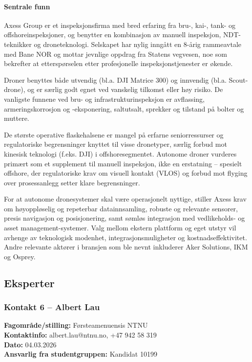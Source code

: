 \paragraph{Sentrale funn}

Axess Group er et inspeksjonsfirma med bred erfaring fra bru-, kai-, tank- og offshoreinspeksjoner, og benytter en kombinasjon av manuell inspeksjon, NDT-teknikker og droneteknologi. Selskapet har nylig inngått en 8-årig rammeavtale med Bane NOR og mottar jevnlige oppdrag fra Statens vegvesen, noe som bekrefter at etterspørselen etter profesjonelle inspeksjonstjenester er økende.

Droner benyttes både utvendig (bl.a. DJI Matrice 300) og innvendig (bl.a. Scout-drone), og er særlig godt egnet ved vanskelig tilkomst eller høy risiko. De vanligste funnene ved bru- og infrastrukturinspeksjon er avflassing, armeringskorrosjon og -eksponering, saltutsalt, sprekker og tilstand på bolter og muttere.

De største operative flaskehalsene er mangel på erfarne seniorressurser og regulatoriske begrensninger knyttet til visse dronetyper, særlig forbud mot kinesisk teknologi (f.eks. DJI) i offshoresegmentet. Autonome droner vurderes primært som et supplement til manuell inspeksjon, ikke en erstatning – spesielt offshore, der regulatoriske krav om visuell kontakt (VLOS) og forbud mot flyging over prosessanlegg setter klare begrensninger.

For at autonome dronesystemer skal være operasjonelt nyttige, stiller Axess krav om høyoppløselig og repeterbar datainnsamling, robuste og relevante sensorer, presis navigasjon og posisjonering, samt sømløs integrasjon med vedlikeholds- og asset management-systemer. Valg mellom ekstern plattform og eget utstyr vil avhenge av teknologisk modenhet, integrasjonsmuligheter og kostnadseffektivitet. Andre relevante aktører i bransjen som ble nevnt inkluderer Aker Solutions, IKM og Osprey.

\subsection{Eksperter}

\subsubsection{Kontakt 6  – Albert Lau}
\label{kontakt:lau}

\textbf{Fagområde/stilling:} Førsteamenuensis NTNU \\
\textbf{Kontaktinfo:} albert.lau@ntnu.no, +47 942 58 319 \\
\textbf{Dato:} 04.03.2026 \\
\textbf{Ansvarlig fra studentgruppen:} Kandidat 10199

